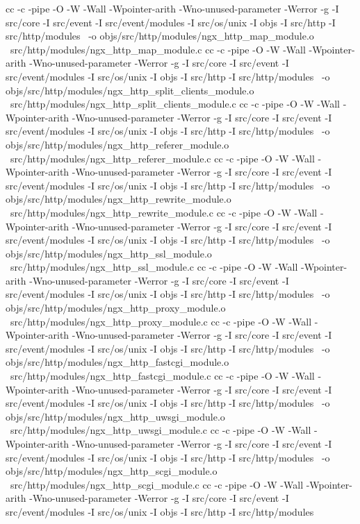 cc -c -pipe  -O -W -Wall -Wpointer-arith -Wno-unused-parameter -Werror -g  -I src/core -I src/event -I src/event/modules -I src/os/unix -I objs -I src/http -I src/http/modules \
	-o objs/src/http/modules/ngx_http_map_module.o \
	src/http/modules/ngx_http_map_module.c
cc -c -pipe  -O -W -Wall -Wpointer-arith -Wno-unused-parameter -Werror -g  -I src/core -I src/event -I src/event/modules -I src/os/unix -I objs -I src/http -I src/http/modules \
	-o objs/src/http/modules/ngx_http_split_clients_module.o \
	src/http/modules/ngx_http_split_clients_module.c
cc -c -pipe  -O -W -Wall -Wpointer-arith -Wno-unused-parameter -Werror -g  -I src/core -I src/event -I src/event/modules -I src/os/unix -I objs -I src/http -I src/http/modules \
	-o objs/src/http/modules/ngx_http_referer_module.o \
	src/http/modules/ngx_http_referer_module.c
cc -c -pipe  -O -W -Wall -Wpointer-arith -Wno-unused-parameter -Werror -g  -I src/core -I src/event -I src/event/modules -I src/os/unix -I objs -I src/http -I src/http/modules \
	-o objs/src/http/modules/ngx_http_rewrite_module.o \
	src/http/modules/ngx_http_rewrite_module.c
cc -c -pipe  -O -W -Wall -Wpointer-arith -Wno-unused-parameter -Werror -g  -I src/core -I src/event -I src/event/modules -I src/os/unix -I objs -I src/http -I src/http/modules \
	-o objs/src/http/modules/ngx_http_ssl_module.o \
	src/http/modules/ngx_http_ssl_module.c
cc -c -pipe  -O -W -Wall -Wpointer-arith -Wno-unused-parameter -Werror -g  -I src/core -I src/event -I src/event/modules -I src/os/unix -I objs -I src/http -I src/http/modules \
	-o objs/src/http/modules/ngx_http_proxy_module.o \
	src/http/modules/ngx_http_proxy_module.c
cc -c -pipe  -O -W -Wall -Wpointer-arith -Wno-unused-parameter -Werror -g  -I src/core -I src/event -I src/event/modules -I src/os/unix -I objs -I src/http -I src/http/modules \
	-o objs/src/http/modules/ngx_http_fastcgi_module.o \
	src/http/modules/ngx_http_fastcgi_module.c
cc -c -pipe  -O -W -Wall -Wpointer-arith -Wno-unused-parameter -Werror -g  -I src/core -I src/event -I src/event/modules -I src/os/unix -I objs -I src/http -I src/http/modules \
	-o objs/src/http/modules/ngx_http_uwsgi_module.o \
	src/http/modules/ngx_http_uwsgi_module.c
cc -c -pipe  -O -W -Wall -Wpointer-arith -Wno-unused-parameter -Werror -g  -I src/core -I src/event -I src/event/modules -I src/os/unix -I objs -I src/http -I src/http/modules \
	-o objs/src/http/modules/ngx_http_scgi_module.o \
	src/http/modules/ngx_http_scgi_module.c
cc -c -pipe  -O -W -Wall -Wpointer-arith -Wno-unused-parameter -Werror -g  -I src/core -I src/event -I src/event/modules -I src/os/unix -I objs -I src/http -I src/http/modules \
